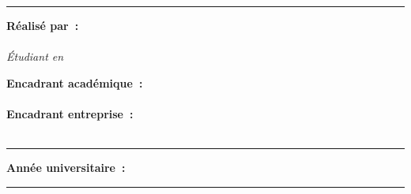\begin{titlepage}
\vspace{0.5cm}
{\color{mainblue}\rule{\textwidth}{0.8pt}}
\vspace{0.8cm}

\begin{minipage}[t]{0.45\textwidth}
  {\bfseries\color{mainblue} Réalisé par~:}\\[0.3cm]
  \etudiant\\[0.1cm]
  \textit{Étudiant en \specialite}\\[0.1cm]
  \textit{\ecole}
\end{minipage}
\hfill
\begin{minipage}[t]{0.45\textwidth}
  {\bfseries\color{mainblue} Encadrant académique~:}\\[0.15cm]
  \encadreurAcad\\[0.3cm]
  {\bfseries\color{mainblue} Encadrant entreprise~:}\\[0.15cm]
  \encadreurPro\\[0.1cm]
  \textit{\entreprise}
\end{minipage}

\vspace{0.6cm}

{\color{mainblue}\rule{\textwidth}{0.8pt}}
\vspace{0.25cm}
\begin{center}
  {\bfseries\color{mainblue} Année universitaire~: \annee}
\end{center}
{\color{mainblue}\rule{\textwidth}{0.8pt}}

\restoregeometry
\end{titlepage}
